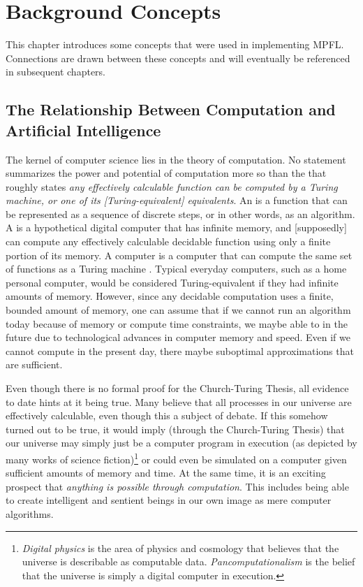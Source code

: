 \chapter{Background Concepts}
This chapter introduces some concepts that were used in implementing MPFL. Connections are drawn between these concepts and will eventually be referenced in subsequent chapters.

\section{The Relationship Between Computation and Artificial Intelligence}
The kernel of computer science lies in the theory of computation. No statement summarizes the power and potential of computation more so than the  that roughly states \textit{any effectively calculable function can be computed by a Turing machine, or one of its [Turing-equivalent] equivalents}. An  is a function that can be represented as a sequence of discrete steps, or in other words, as an algorithm. A  is a hypothetical digital computer that has infinite memory, and [supposedly] can compute any effectively calculable decidable function using only a finite portion of its memory. A  computer is a computer that can compute the same set of functions as a Turing machine \citep{sipser:computationtheory}. Typical everyday computers, such as a home personal computer, would be considered Turing-equivalent if they had infinite amounts of memory. However, since any decidable computation uses a finite, bounded amount of memory, one can assume that if we cannot run an algorithm today because of memory or compute time constraints, we maybe able to in the future due to technological advances in computer memory and speed. Even if we cannot compute in the present day, there maybe suboptimal approximations that are sufficient. 

Even though there is no formal proof for the Church-Turing Thesis, all evidence to date hints at it being true. Many believe that all processes in our universe are effectively calculable, even though this a subject of debate. If this somehow turned out to be true, it would imply (through the Church-Turing Thesis) that our universe may simply just be a computer program in execution (as depicted by many works of science fiction)\footnote{\textit{Digital physics} is the area of physics and cosmology that believes that the universe is describable as computable data. \textit{Pancomputationalism} is the belief that the universe is simply a digital computer in execution.} or could even be simulated on a computer given sufficient amounts of memory and time. At the same time, it is an exciting prospect that \textit{anything is possible through computation}. This includes being able to create intelligent and sentient beings in our own image as mere computer algorithms.

